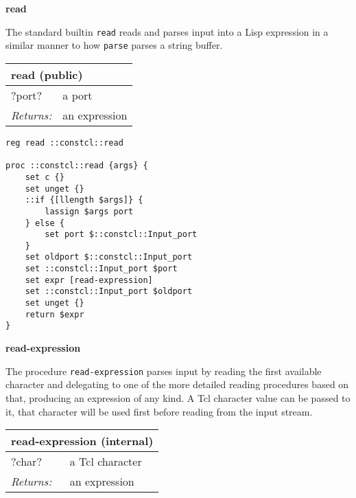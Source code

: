 \documentclass{report}
\begin{document}
\textbf{read}


The standard builtin \texttt{read} reads and parses input into a Lisp expression in a similar manner to how \texttt{parse} parses a string buffer.

\begin{tabular}{ |l l| }
\hline
\multicolumn{2}{|l|}{read (public)} \\
\hline
?port? & a port \\
\textit{Returns:} & an expression \\
\hline
\end{tabular}

\noindent\makebox[\linewidth]{\rule{\linewidth}{0.4pt}}
\begin{lstlisting}
reg read ::constcl::read
 
proc ::constcl::read {args} {
    set c {}
    set unget {}
    ::if {[llength $args]} {
        lassign $args port
    } else {
        set port $::constcl::Input_port
    }
    set oldport $::constcl::Input_port
    set ::constcl::Input_port $port
    set expr [read-expression]
    set ::constcl::Input_port $oldport
    set unget {}
    return $expr
}
\end{lstlisting}
\noindent\makebox[\linewidth]{\rule{\linewidth}{0.4pt}}

\textbf{read-expression}


The procedure \texttt{read-expression} parses input by reading the first available character and delegating to one of the more detailed reading procedures based on that, producing an expression of any kind. A Tcl character value can be passed to it, that character will be used first before reading from the input stream.

\begin{tabular}{ |l l| }
\hline
\multicolumn{2}{|l|}{read-expression (internal)} \\
\hline
?char? & a Tcl character \\
\textit{Returns:} & an expression \\
\hline
\end{tabular}
\end{document}
